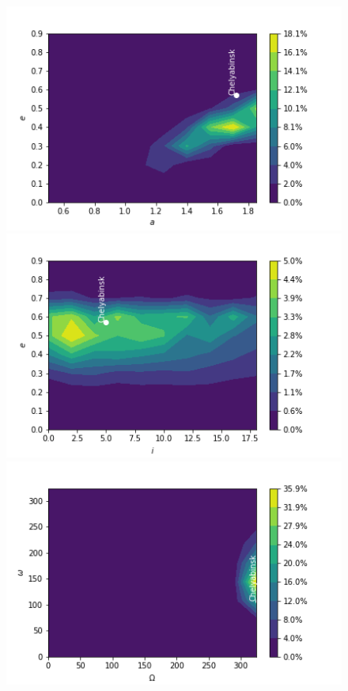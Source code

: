 \documentclass[fleqn,usenatbib]{mnras}
\begin{document}
\begin{figure}  
  \centering
  \vspace{0.2cm}
   \includegraphics[scale=0.38]{ae-Chelyabinsk.png}\hspace{-0.1em}%
   \includegraphics[scale=0.38]{ie-Chelyabinsk.png}\hspace{-0.1em}%
   \includegraphics[scale=0.38]{Wo-Chelyabinsk.png}

\end{figure}
\end{document}
